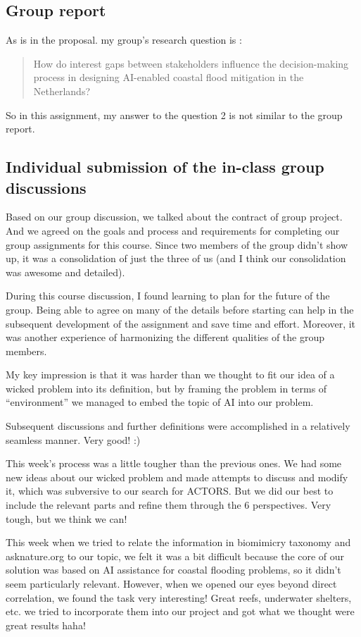 \documentclass[UTF8,a4paper,AutoFakeBold,AutoFakeSlant]{article}
\begin{document}
\subsection{Group report}

As is in the proposal. my group's research question is :
\begin{quote}
    How do interest gaps between stakeholders influence the decision-making process in
designing AI-enabled coastal flood mitigation in the Netherlands?
\end{quote}
So in this assignment, my answer to the question 2 is not similar to the group report.


\subsection{Individual submission of the in-class group discussions}

Based on our group discussion, we talked about the contract of group project. 
And  we agreed on the goals and process and requirements for completing our group assignments for this course.
Since two members of the group didn't show up, it was a consolidation of just the three of us (and I think our consolidation was awesome and detailed).

During this course discussion, I found learning to plan for the future of the group. Being able to agree on many of the details before starting can help in the subsequent development of the assignment and save time and effort. Moreover, it was another experience of harmonizing the different qualities of the group members.


My key impression is that it was harder than we thought to fit our idea of a wicked problem into its definition, but by framing the problem in terms of “environment” we managed to embed the topic of AI into our problem.

Subsequent discussions and further definitions were accomplished in a relatively seamless manner. Very good! :)



This week's process was a little tougher than the previous ones. We had some new ideas about our wicked problem and made attempts to discuss and modify it, which was subversive to our search for ACTORS. But we did our best to include the relevant parts and refine them through the 6 perspectives. Very tough, but we think we can!



This week when we tried to relate the information in biomimicry taxonomy and asknature.org to our topic, we felt it was a bit difficult because the core of our solution was based on AI assistance for coastal flooding problems, so it didn't seem particularly relevant. However, when we opened our eyes beyond direct correlation, we found the task very interesting! Great reefs, underwater shelters, etc. we tried to incorporate them into our project and got what we thought were great results haha!
\end{document}
